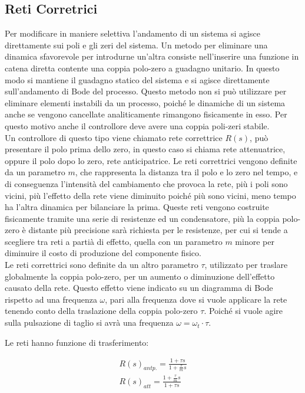\documentclass{article}
\numberwithin{equation}{subsection}
\begin{document}
\subsection{Reti Corretrici}

Per modificare in maniere selettiva l'andamento di un sistema si agisce direttamente sui poli e gli zeri del sistema. Un metodo per eliminare una dinamica sfavorevole per 
introdurne un'altra consiste nell'inserire una funzione in catena diretta contente una coppia polo-zero a guadagno unitario. In questo modo si mantiene il guadagno statico 
del sistema e si agisce direttamente sull'andamento di Bode del processo. Questo metodo non si può utilizzare per eliminare elementi instabili da un processo, poiché le 
dinamiche di un sistema anche se vengono cancellate analiticamente rimangono fisicamente in esso. Per questo motivo anche il controllore deve avere una coppia poli-zeri 
stabile. \\

Un controllore di questo tipo viene chiamato rete correttrice $R(s)$, può presentare il polo prima dello zero, in questo caso si chiama rete attenuatrice, oppure il polo 
dopo lo zero, rete anticipatrice. Le reti correttrici vengono definite da un parametro $m$, che rappresenta la distanza tra il polo e lo zero nel tempo, e di conseguenza 
l'intensità del cambiamento che provoca la rete, più i poli sono vicini, più l'effetto della rete viene diminuito poiché più sono vicini, meno tempo ha l'altra dinamica 
per bilanciare la prima. Queste reti vengono costruite fisicamente tramite una serie di resistenze ed un condensatore, più la coppia polo-zero è distante più precisione sarà richiesta per le 
resistenze, per cui si tende a scegliere tra reti a partià di effetto, quella con un parametro $m$ minore per diminuire il costo di produzione del componente fisico. \\

Le reti correttrici sono definite da un altro parametro $\tau$, utilizzato per traslare globalmente la coppia polo-zero, per un aumento o diminuzione dell'effetto 
causato della rete. Questo effetto viene indicato su un diagramma di Bode rispetto ad una frequenza $\omega$, pari alla frequenza dove si vuole applicare la rete tenendo 
conto della traslazione della coppia polo-zero $\tau$. Poiché si vuole agire sulla pulsazione di taglio si avrà una frequenza $\omega=\omega_t\cdot\tau$. 

Le reti hanno funzione di trasferimento: 

\begin{gather}
    R(s)_{antp.}=\displaystyle\frac{1+\tau s}{1+\displaystyle\frac{\tau}{m}s}\\
    R(s)_{att}=\displaystyle\frac{1+\displaystyle\frac{\tau}{m}s}{1+\tau s}
\end{gather}
\end{document}
